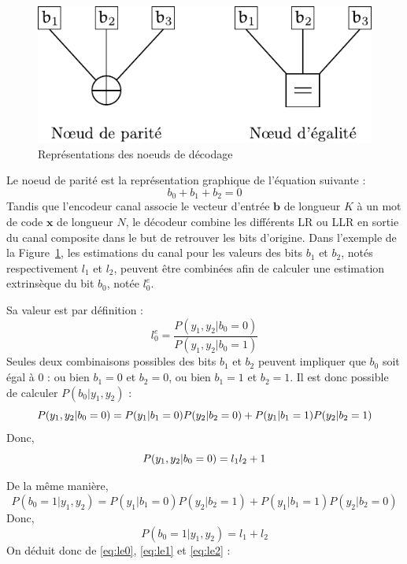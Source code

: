 \begin{figure}[t]
\centering
\includegraphics{tail/appendix_1_fig/noeuds}
\caption{Représentations des noeuds de décodage}
\label{fig:noeuds}
\end{figure}

Le noeud de parité est la représentation graphique de l'équation suivante : 
\begin{equation}
b_0 + b_1 + b_2 = 0
\end{equation}
Tandis que l'encodeur canal associe le vecteur d'entrée $\mathbold{b}$ de longueur $K$ à un mot de code $\mathbold{x}$ de longueur $N$, le décodeur combine les différents LR ou LLR en sortie du canal composite dans le but de retrouver les bits d'origine.
Dans l'exemple de la Figure~\ref{fig:noeuds}, les estimations du canal pour les valeurs des bits $b_1$ et $b_2$, notés respectivement $l_1$ et $l_2$, peuvent être combinées afin de calculer une estimation extrinsèque du bit $b_0$, notée $l_0^e$.

Sa valeur est par définition :
\begin{equation}
l^e_0 = \dfrac{P(y_1,y_2 | b_0 = 0)}{P(y_1,y_2 | b_0 = 1)}
\label{eq:le0}
\end{equation}
Seules deux combinaisons possibles des bits $b_1$ et $b_2$ peuvent impliquer que $b_0$ soit égal à $0$ : ou bien $b_1=0$ et $b_2=0$, ou bien $b_1=1$ et $b_2=1$. Il est donc possible de calculer $P(b_0|y_1,y_2)$ : 
\begin{equation}
P(y_1,y_2 | b_0 = 0)  =  P(y_1 | b_1 = 0)P(y_2 | b_2 = 0) + P(y_1 | b_1 = 1)P(y_2 | b_2 = 1) \\
\end{equation}
Donc,  
\begin{equation}
P(y_1,y_2 | b_0 = 0)  =  l_1l_2 + 1 \\
\label{eq:le1}
\end{equation}


De la même manière,
\begin{equation}
P(b_0 = 1 | y_1,y_2) =P(y_1 | b_1 = 0)P(y_2 | b_2 = 1) + P(y_1 | b_1 = 1)P(y_2 | b_2 = 0)
\end{equation}
Donc, 
\begin{equation}
P(b_0 = 1 | y_1,y_2) = l_1 + l_2
\label{eq:le2}
\end{equation}
On déduit donc de \ref{eq:le0}, \ref{eq:le1} et \ref{eq:le2} : 

